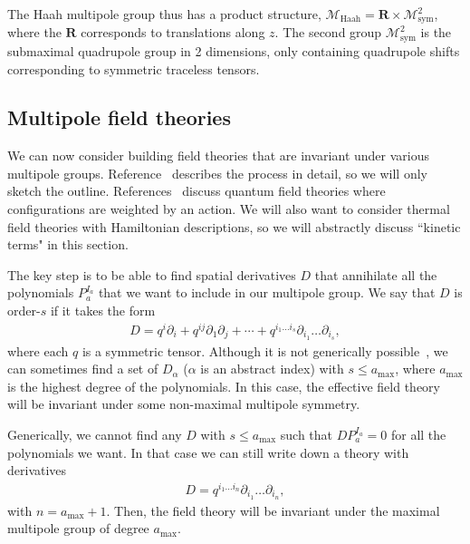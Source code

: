 \documentclass[twocolumn, longbibliography]{revtex4-2}
\begin{document}
The Haah multipole group thus has a product structure, $\mathcal{M}_\text{Haah} = \mathbf{R} \times \mathcal{M}^2_\text{sym}$, where the $\mathbf{R}$ corresponds to translations along $z$. The second group $\mathcal{M}^2_\text{sym}$ is the submaximal quadrupole group in 2 dimensions, only containing quadrupole shifts corresponding to symmetric traceless tensors.

\subsection{Multipole field theories} \label{sub:field}

We can now consider building field theories that are invariant under various multipole groups. Reference~\cite{Gromov2019} describes the process in detail, so we will only sketch the outline. References~\cite{Griffin2015, Gromov2019} discuss quantum field theories where configurations are weighted by an action. We will also want to consider thermal field theories with Hamiltonian descriptions, so we will abstractly discuss ``kinetic terms" in this section.

The key step is to be able to find spatial derivatives $D$ that annihilate all the polynomials $P_a^{I_a}$ that we want to include in our multipole group. We say that $D$ is order-$s$ if it takes the form
\begin{align}
D = q^i\partial_i + q^{ij}\partial_1\partial_j + \cdots + q^{i_1\dots i_s}\partial_{i_1}\dots\partial_{i_s},
\end{align}
where each $q$ is a symmetric tensor. Although it is not generically possible~\cite{Gromov2019}, we can sometimes find a set of $D_\alpha$ ($\alpha$ is an abstract index) with $s\le a_{\text{max}}$, where $a_\text{max}$ is the highest degree of the polynomials. In this case, the effective field theory will be invariant under some non-maximal multipole symmetry. 

Generically, we cannot find any $D$ with $s\le a_\text{max}$ such that $DP_a^{I_a} = 0$ for all the polynomials we want. In that case we can still write down a theory with derivatives 
\begin{align}
D = q^{i_1\dots i_n}\partial_{i_1}\dots \partial_{i_n},
\end{align}
with $n=a_\text{max}+1$. Then, the field theory will be invariant under the maximal multipole group of degree $a_\text{max}$. 
\end{document}
